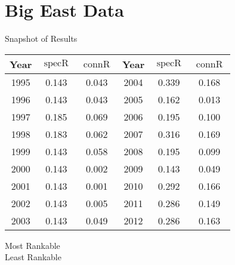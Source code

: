 \documentclass{beamer}
\DeclareMathOperator{\specR}{specR}
\DeclareMathOperator{\connR}{connR}
\begin{document}
\section{Big East Data}

\begin{frame}{Snapshot of Results}
\centering
\begin{tabular}{|| c | c | c || c | c | c ||}
\hline
Year & $\specR$ & $\connR$ & Year & $\specR$ & $\connR$ \\
\hline\hline
1995 & 0.143 & 0.043 & \cellcolor{lsilver} 2004 & \cellcolor{lsilver} 0.339 & \cellcolor{lsilver} 0.168 \\ 
1996 & 0.143 & 0.043 & 2005 & 0.162 & 0.013 \\
1997 & 0.185 & 0.069 & 2006 & 0.195 & 0.100 \\
1998 & 0.183 & 0.062 & \cellcolor{lsilver} 2007 & \cellcolor{lsilver} 0.316 & \cellcolor{lsilver} 0.169 \\
1999 & 0.143 & 0.058 & 2008 & 0.195 & 0.099 \\
\cellcolor{lblue} 2000 & \cellcolor{lblue} 0.143 & \cellcolor{lblue} 0.002 & 2009 & 0.143 & 0.049 \\
\cellcolor{lblue} 2001 & \cellcolor{lblue} 0.143 & \cellcolor{lblue} 0.001 & 2010 & 0.292 & 0.166 \\
2002 & 0.143 & 0.005 & 2011 & 0.286 & 0.149 \\
2003 & 0.143 & 0.049 & 2012 & 0.286 & 0.163 \\
\hline
\end{tabular}
\vfill
{}\quad Most Rankable\\
\vfill
{}\quad Least Rankable\\
\end{frame}
\end{document}
